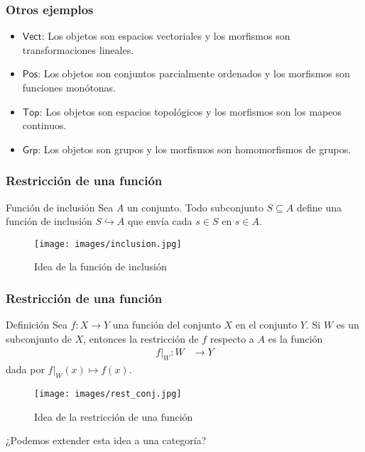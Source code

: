 \documentclass[10pt, aspectratio = 43,usenames,dvipsnames]{beamer}
\begin{document}
	
	\begin{frame}[t]
		\frametitle{Otros ejemplos}
		\begin{itemize}
			\item $\mathsf{Vect}$: Los objetos son espacios vectoriales y los morfismos son transformaciones lineales.
			\item $\mathsf{Pos}$: Los objetos son conjuntos parcialmente ordenados y los morfismos son funciones monótonas.
			\item $\mathsf{Top}$: Los objetos son espacios topológicos y los morfismos son los mapeos continuos.
			\item $\mathsf{Grp}$: Los objetos son grupos y los morfismos son homomorfismos de grupos.
		\end{itemize}
	\end{frame}

	\begin{frame}[t]
		\frametitle{Restricción de una función}
		\begin{block}{Función de inclusión}
			Sea $A$ un conjunto. Todo subconjunto $S\subseteq A$ define una función de inclusión $S\hookrightarrow A$ que envía cada $s\in S$ en $s\in A$. 
		\end{block}
		\begin{figure}
			\texttt{[image: images/inclusion.jpg]}
			\caption{Idea de la función de inclusión}
		\end{figure}
	\end{frame}

	\begin{frame}[t]
		\frametitle{Restricción de una función}
		\begin{block}{Definición}
			Sea $f: X\to Y$ una función del conjunto $X$ en el conjunto $Y$. Si $W$ es un subconjunto de $X$, entonces la restricción de $f$ respecto a $A$ es la función
			\begin{align*}
				f|_{W}: W&\to Y
			\end{align*}
			dada por $f|_{W}(x)\mapsto f(x)$.
		\end{block}
		\begin{figure}
			\texttt{[image: images/rest\_conj.jpg]}
			\caption{Idea de la restricción de una función}
		\end{figure}
	\end{frame}
	
	\begin{frame}
		\begin{center}
		\LARGE¿Podemos extender esta idea a una categoría?
		\end{center}
	\end{frame}
\end{document}
